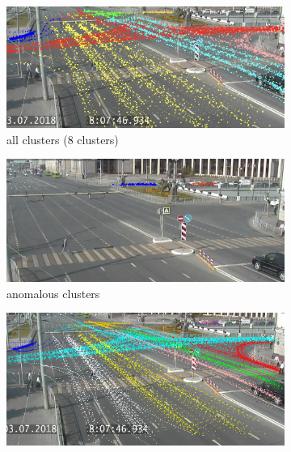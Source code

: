 \begin{figure}[!htb]
	\centering
	\begin{subfigure}[!htb]{0.495\textwidth}
		\centering{}
		\includegraphics[width=\textwidth]{images/cl-classif-norm-1.jpeg}
		\caption{all clusters (8 clusters)}
		\label{fig:cl-classif-norm-1}
	\end{subfigure}
	\hfill
	\begin{subfigure}[!htb]{0.495\textwidth}
		\centering{}
		\includegraphics[width=\textwidth]{images/cl-classif-anom-1.jpeg}
		\caption{anomalous clusters}
		\label{fig:cl-classif-anom-1}
	\end{subfigure}
	\hfill
	\begin{subfigure}[!htb]{0.495\textwidth}
		\centering{}
		\includegraphics[width=\textwidth]{images/cl-classif-norm-11.png}

\end{subfigure}
\end{figure}
